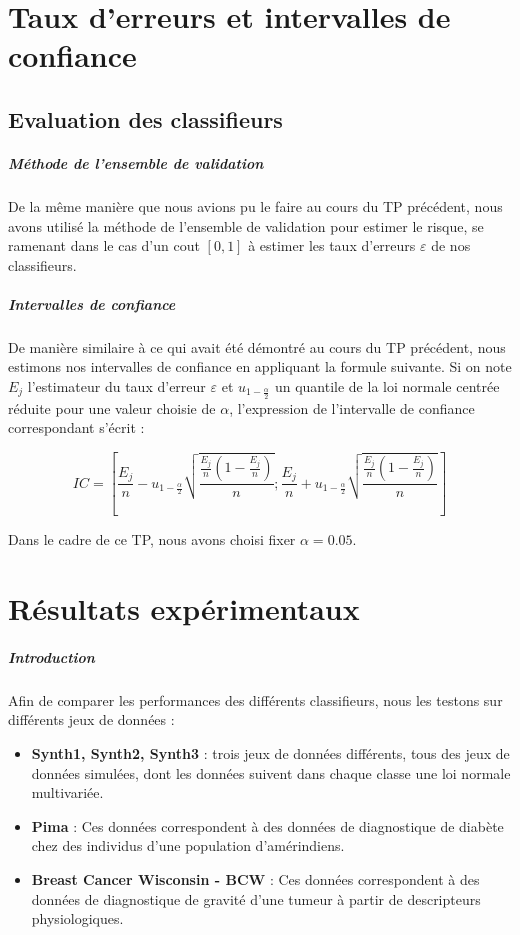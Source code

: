 \documentclass{report}
\begin{document}
\chapter{Taux d'erreurs et intervalles de confiance}
\section{Evaluation des classifieurs}
\paragraph{Méthode de l'ensemble de validation}
De la même manière que nous avions pu le faire au cours du TP précédent, nous avons utilisé la méthode de l'ensemble de validation pour estimer le risque, se ramenant dans le cas d'un cout $[0,1]$ à estimer les taux d'erreurs $\varepsilon$ de nos classifieurs.

\paragraph{Intervalles de confiance}
De manière similaire à ce qui avait été démontré au cours du TP précédent, nous estimons nos intervalles de confiance en appliquant la formule suivante. Si on note $E_j$ l'estimateur du taux d'erreur $\varepsilon$ et $u_{1-\frac{\alpha}{2}}$ un quantile de la loi normale centrée réduite pour une valeur choisie de $\alpha$, l'expression de l'intervalle de confiance correspondant s'écrit :

$$IC = [\frac{E_j}{n} - u_{1 - \frac{\alpha}{2}}\sqrt{\frac{\frac{E_j}{n} (1 - \frac{E_j}{n})}{n}} ; \frac{E_j}{n} + u_{1 - \frac{\alpha}{2}}\sqrt{\frac{\frac{E_j}{n} (1 - \frac{E_j}{n})}{n}}]$$


Dans le cadre de ce TP, nous avons choisi fixer $\alpha = 0.05$.

\chapter{Résultats expérimentaux}
\paragraph{Introduction}
Afin de comparer les performances des différents classifieurs, nous les testons sur différents jeux de données :
\begin{itemize}
    \item \textbf{Synth1, Synth2, Synth3} : trois jeux de données différents, tous des jeux de données simulées, dont les données suivent dans chaque classe une loi normale multivariée.
    \item \textbf{Pima} : Ces données correspondent à des données de diagnostique de diabète chez des individus d'une population d'amérindiens.
    \item \textbf{Breast Cancer Wisconsin - BCW} : Ces données correspondent à des données de diagnostique de gravité d'une tumeur à partir de descripteurs physiologiques.
\end{itemize}
\end{document}
